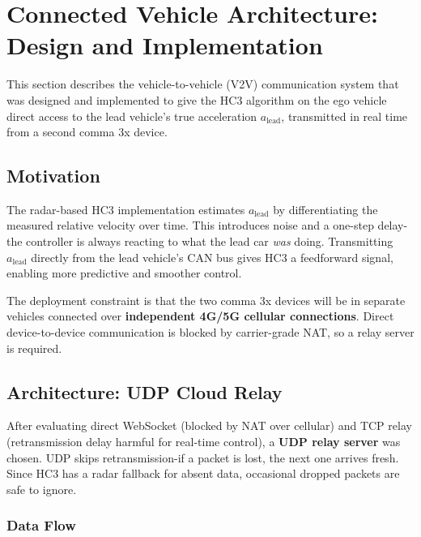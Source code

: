 \documentclass[12pt]{article}
\begin{document}
\section{Connected Vehicle Architecture: Design and Implementation}

This section describes the vehicle-to-vehicle (V2V) communication system that was designed and implemented to give the HC3 algorithm on the ego vehicle direct access to the lead vehicle's true acceleration $a_{\text{lead}}$, transmitted in real time from a second comma 3x device.

\subsection{Motivation}

The radar-based HC3 implementation estimates $a_{\text{lead}}$ by differentiating the measured relative velocity over time. This introduces noise and a one-step delay-the controller is always reacting to what the lead car \emph{was} doing. Transmitting $a_{\text{lead}}$ directly from the lead vehicle's CAN bus gives HC3 a feedforward signal, enabling more predictive and smoother control.

The deployment constraint is that the two comma 3x devices will be in separate vehicles connected over \textbf{independent 4G/5G cellular connections}. Direct device-to-device communication is blocked by carrier-grade NAT, so a relay server is required.

\subsection{Architecture: UDP Cloud Relay}

After evaluating direct WebSocket (blocked by NAT over cellular) and TCP relay (retransmission delay harmful for real-time control), a \textbf{UDP relay server} was chosen. UDP skips retransmission-if a packet is lost, the next one arrives fresh. Since HC3 has a radar fallback for absent data, occasional dropped packets are safe to ignore.

\subsubsection{Data Flow}
\end{document}
